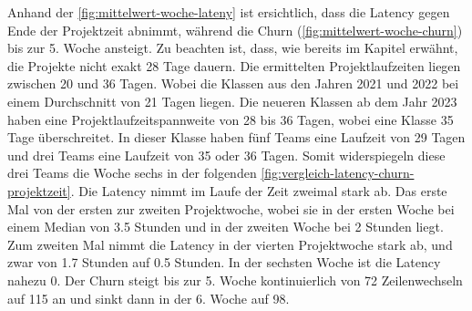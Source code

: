 Anhand der \autoref{fig:mittelwert-woche-lateny} ist ersichtlich, dass die Latency gegen Ende der Projektzeit abnimmt, während die Churn (\autoref{fig:mittelwert-woche-churn}) bis zur 5. Woche ansteigt. 
Zu beachten ist, dass, wie bereits im Kapitel  erwähnt, die Projekte nicht exakt 28 Tage dauern. Die ermittelten Projektlaufzeiten liegen zwischen 20 und 36 Tagen.
Wobei die Klassen aus den Jahren 2021 und 2022 bei einem Durchschnitt von 21 Tagen liegen. Die neueren Klassen ab dem Jahr 2023 haben eine Projektlaufzeitspannweite von 28 bis 36 Tagen, wobei eine Klasse 35 Tage überschreitet. In dieser Klasse haben fünf Teams eine Laufzeit von 29 Tagen und drei Teams eine Laufzeit von 35 oder 36 Tagen. Somit widerspiegeln diese drei Teams die Woche sechs in der folgenden \autoref{fig:vergleich-latency-churn-projektzeit}. Die Latency nimmt im Laufe der Zeit zweimal stark ab. Das erste Mal von der ersten zur zweiten Projektwoche, wobei sie in der ersten Woche bei einem Median von 3.5 Stunden und in der zweiten Woche bei 2 Stunden liegt. Zum zweiten Mal nimmt die Latency in der vierten Projektwoche stark ab, und zwar von 1.7 Stunden auf 0.5 Stunden. In der sechsten Woche ist die Latency nahezu 0. Der Churn steigt bis zur 5. Woche kontinuierlich von 72 Zeilenwechseln auf 115 an und sinkt dann in der 6. Woche auf 98.
